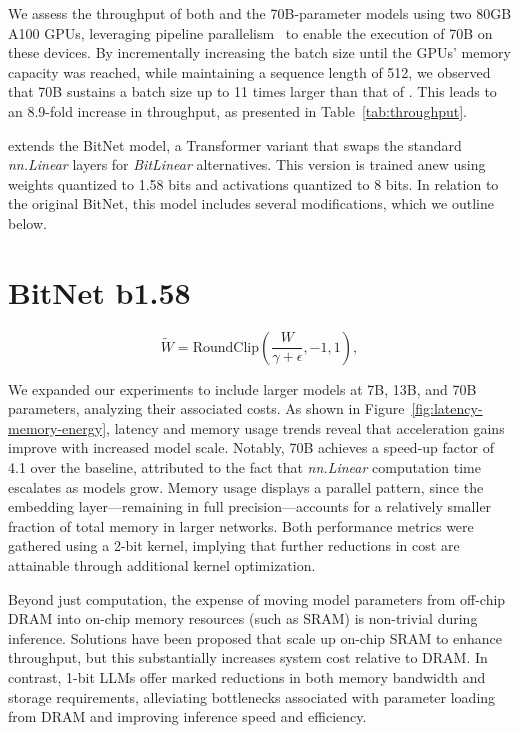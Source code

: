 We assess the throughput of both  and the 70B-parameter  models using two 80GB A100 GPUs, leveraging pipeline parallelism~\cite{gpipe} to enable the execution of  70B on these devices. By incrementally increasing the batch size until the GPUs’ memory capacity was reached, while maintaining a sequence length of 512, we observed that  70B sustains a batch size up to 11 times larger than that of . This leads to an 8.9-fold increase in throughput, as presented in Table~\ref{tab:throughput}.

 extends the BitNet model, a Transformer variant that swaps the standard \emph{nn.Linear} layers for \emph{BitLinear} alternatives. This version is trained anew using weights quantized to 1.58 bits and activations quantized to 8 bits. In relation to the original BitNet, this model includes several modifications, which we outline below.

\section{BitNet b1.58}

\begin{equation}
    \widetilde{W} = \mathrm{RoundClip}(\frac{W}{\gamma + \epsilon}, -1, 1),
\end{equation}

We expanded our experiments to include larger models at 7B, 13B, and 70B parameters, analyzing their associated costs. As shown in Figure~\ref{fig:latency-memory-energy}, latency and memory usage trends reveal that acceleration gains improve with increased model scale. Notably,  70B achieves a speed-up factor of 4.1 over the  baseline, attributed to the fact that \emph{nn.Linear} computation time escalates as models grow. Memory usage displays a parallel pattern, since the embedding layer—remaining in full precision—accounts for a relatively smaller fraction of total memory in larger networks. Both performance metrics were gathered using a 2-bit kernel, implying that further reductions in cost are attainable through additional kernel optimization.

Beyond just computation, the expense of moving model parameters from off-chip DRAM into on-chip memory resources (such as SRAM) is non-trivial during inference. Solutions have been proposed that scale up on-chip SRAM to enhance throughput, but this substantially increases system cost relative to DRAM. In contrast, 1-bit LLMs offer marked reductions in both memory bandwidth and storage requirements, alleviating bottlenecks associated with parameter loading from DRAM and improving inference speed and efficiency.

